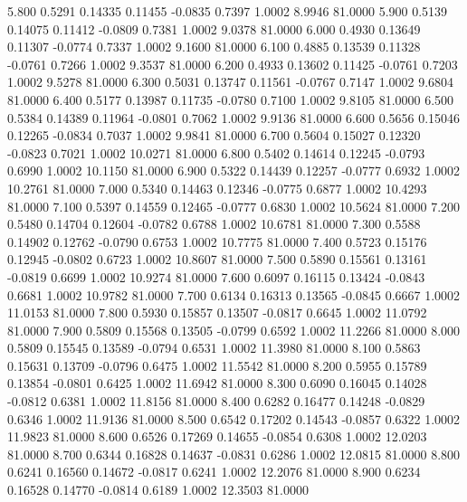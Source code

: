    5.800   0.5291   0.14335   0.11455  -0.0835   0.7397   1.0002   8.9946  81.0000
   5.900   0.5139   0.14075   0.11412  -0.0809   0.7381   1.0002   9.0378  81.0000
   6.000   0.4930   0.13649   0.11307  -0.0774   0.7337   1.0002   9.1600  81.0000
   6.100   0.4885   0.13539   0.11328  -0.0761   0.7266   1.0002   9.3537  81.0000
   6.200   0.4933   0.13602   0.11425  -0.0761   0.7203   1.0002   9.5278  81.0000
   6.300   0.5031   0.13747   0.11561  -0.0767   0.7147   1.0002   9.6804  81.0000
   6.400   0.5177   0.13987   0.11735  -0.0780   0.7100   1.0002   9.8105  81.0000
   6.500   0.5384   0.14389   0.11964  -0.0801   0.7062   1.0002   9.9136  81.0000
   6.600   0.5656   0.15046   0.12265  -0.0834   0.7037   1.0002   9.9841  81.0000
   6.700   0.5604   0.15027   0.12320  -0.0823   0.7021   1.0002  10.0271  81.0000
   6.800   0.5402   0.14614   0.12245  -0.0793   0.6990   1.0002  10.1150  81.0000
   6.900   0.5322   0.14439   0.12257  -0.0777   0.6932   1.0002  10.2761  81.0000
   7.000   0.5340   0.14463   0.12346  -0.0775   0.6877   1.0002  10.4293  81.0000
   7.100   0.5397   0.14559   0.12465  -0.0777   0.6830   1.0002  10.5624  81.0000
   7.200   0.5480   0.14704   0.12604  -0.0782   0.6788   1.0002  10.6781  81.0000
   7.300   0.5588   0.14902   0.12762  -0.0790   0.6753   1.0002  10.7775  81.0000
   7.400   0.5723   0.15176   0.12945  -0.0802   0.6723   1.0002  10.8607  81.0000
   7.500   0.5890   0.15561   0.13161  -0.0819   0.6699   1.0002  10.9274  81.0000
   7.600   0.6097   0.16115   0.13424  -0.0843   0.6681   1.0002  10.9782  81.0000
   7.700   0.6134   0.16313   0.13565  -0.0845   0.6667   1.0002  11.0153  81.0000
   7.800   0.5930   0.15857   0.13507  -0.0817   0.6645   1.0002  11.0792  81.0000
   7.900   0.5809   0.15568   0.13505  -0.0799   0.6592   1.0002  11.2266  81.0000
   8.000   0.5809   0.15545   0.13589  -0.0794   0.6531   1.0002  11.3980  81.0000
   8.100   0.5863   0.15631   0.13709  -0.0796   0.6475   1.0002  11.5542  81.0000
   8.200   0.5955   0.15789   0.13854  -0.0801   0.6425   1.0002  11.6942  81.0000
   8.300   0.6090   0.16045   0.14028  -0.0812   0.6381   1.0002  11.8156  81.0000
   8.400   0.6282   0.16477   0.14248  -0.0829   0.6346   1.0002  11.9136  81.0000
   8.500   0.6542   0.17202   0.14543  -0.0857   0.6322   1.0002  11.9823  81.0000
   8.600   0.6526   0.17269   0.14655  -0.0854   0.6308   1.0002  12.0203  81.0000
   8.700   0.6344   0.16828   0.14637  -0.0831   0.6286   1.0002  12.0815  81.0000
   8.800   0.6241   0.16560   0.14672  -0.0817   0.6241   1.0002  12.2076  81.0000
   8.900   0.6234   0.16528   0.14770  -0.0814   0.6189   1.0002  12.3503  81.0000
